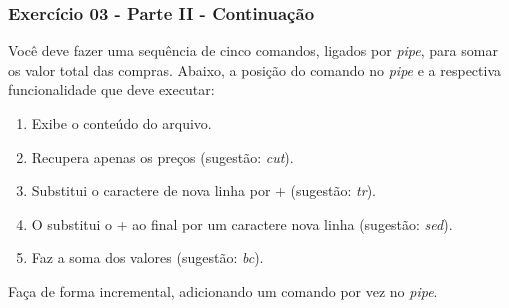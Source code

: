 \documentclass{beamer}
\begin{document}
\begin{frame}[fragile]
   \frametitle{Exercício 03 - Parte II - Continuação}
   Você deve fazer uma sequência de cinco comandos, ligados por \textit{pipe}, para somar os valor total
   das compras. Abaixo, a posição do comando no \textit{pipe} e a respectiva funcionalidade que deve 
   executar:
   \begin{enumerate}
      \item Exibe o conteúdo do arquivo.
      \item Recupera apenas os preços (sugestão: \textit{cut}).
      \item Substitui o caractere de nova linha por + (sugestão:  \textit{tr}).
      \item O substitui o + ao final por um caractere nova linha (sugestão: \textit{sed}).
      \item Faz a soma dos valores (sugestão: \textit{bc}).
   \end{enumerate}
   Faça de forma incremental, adicionando um comando por vez no \textit{pipe}.
\end{frame}


\end{document}
